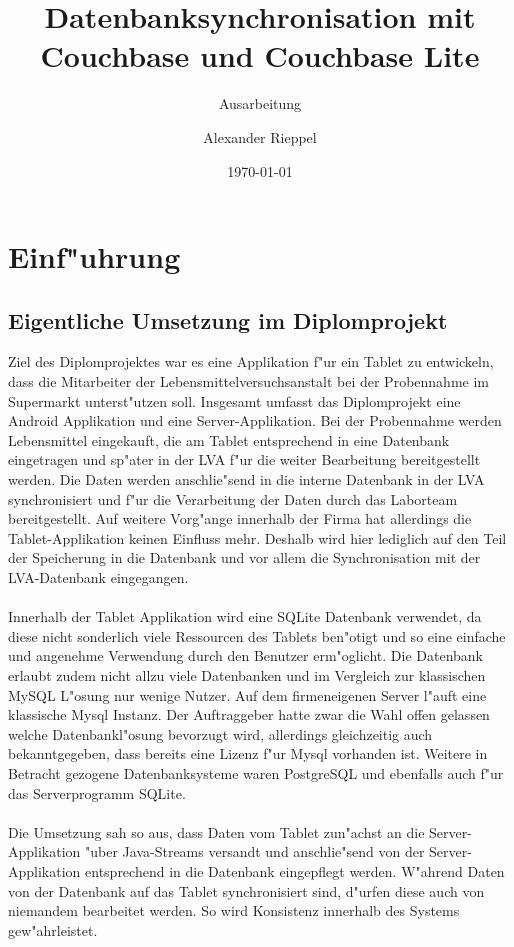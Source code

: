 \documentclass[a4paper,12pt]{scrreprt}
\begin{document}
\author{Alexander Rieppel} %
\title{Datenbanksynchronisation mit Couchbase und Couchbase Lite} %
\subject{VSDB} %
\subtitle{Ausarbeitung} %
\date{\today} %
\publishers{5AHITT} %

\maketitle
\tableofcontents
 

\chapter{Einf"uhrung}
\section{Eigentliche Umsetzung im Diplomprojekt}
Ziel des Diplomprojektes war es eine Applikation f"ur ein Tablet zu entwickeln, dass die Mitarbeiter der Lebensmittelversuchsanstalt bei der Probennahme im Supermarkt unterst"utzen soll. Insgesamt umfasst das Diplomprojekt eine Android Applikation und eine Server-Applikation. Bei der Probennahme werden Lebensmittel eingekauft, die am Tablet entsprechend in eine Datenbank eingetragen und sp"ater in der LVA f"ur die weiter Bearbeitung bereitgestellt werden. Die Daten werden anschlie"send in die interne Datenbank in der LVA synchronisiert und f"ur die Verarbeitung der Daten durch das Laborteam bereitgestellt. Auf weitere Vorg"ange innerhalb der Firma hat allerdings die Tablet-Applikation keinen Einfluss mehr. Deshalb wird hier lediglich auf den Teil der Speicherung in die Datenbank und vor allem die Synchronisation mit der LVA-Datenbank eingegangen. \\\\Innerhalb der Tablet Applikation wird eine SQLite Datenbank verwendet, da diese nicht sonderlich viele Ressourcen des Tablets ben"otigt und so eine einfache und angenehme Verwendung durch den Benutzer erm"oglicht. Die Datenbank erlaubt zudem nicht allzu viele Datenbanken und im Vergleich zur klassischen MySQL L"osung nur wenige Nutzer. Auf dem firmeneigenen Server l"auft eine klassische Mysql Instanz. Der Auftraggeber hatte zwar die Wahl offen gelassen welche Datenbankl"osung bevorzugt wird, allerdings gleichzeitig auch bekanntgegeben, dass bereits eine Lizenz f"ur Mysql vorhanden ist. Weitere in Betracht gezogene Datenbanksysteme waren PostgreSQL und ebenfalls auch f"ur das Serverprogramm SQLite. \\\\ Die Umsetzung sah so aus, dass Daten vom Tablet zun"achst an die Server-Applikation "uber Java-Streams versandt und anschlie"send von der Server-Applikation entsprechend in die Datenbank eingepflegt werden. W"ahrend Daten von der Datenbank auf das Tablet synchronisiert sind, d"urfen diese auch von niemandem bearbeitet werden. So wird Konsistenz innerhalb des Systems gew"ahrleistet.\cite{diploMeins}
\end{document}
